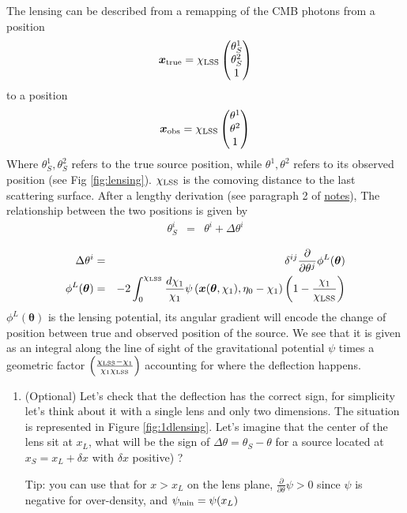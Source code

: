 \documentclass[a4paper, 11pt]{article}
\def\ba{\begin{eqnarray}}
\def\ea{\end{eqnarray}}
\begin{document}
The lensing can be described from a remapping of the CMB photons from a position  
\ba
\bm{x}_{\rm true}  =\chi_{\rm LSS} \begin{pmatrix} 
{\theta}^{1}_{S} \cr
{\theta}^{2}_{S} \cr
 1
 \end{pmatrix} 
\ea
to a position 
\ba
\bm{x}_{\rm obs} = \chi_{\rm LSS}  \begin{pmatrix} 
{\theta}^{1} \cr
{\theta}^{2} \cr
 1
 \end{pmatrix} 
\ea
Where $\theta^{1}_{S}, \theta^{2}_{S}$ refers to the true source position, while  $\theta^{1}, \theta^{2}$ refers to its observed position (see Fig \ref{fig:lensing}).
$\chi_{\rm LSS}$ is the comoving distance to the last scattering surface. After a lengthy derivation (see paragraph 2 of \href{https://github.com/thibautlouis/thibautlouis.github.io/blob/master/derivation.pdf}{notes}), The relationship between the two positions is given by
\ba
 \theta^{i}_{S}  &=&   \theta^{i} + \Delta  \theta^{i} \\
\ea
\ba
 \Delta  \theta^{i} &=& \delta^{ij} \frac{\partial }{\partial \theta^{j}} \phi^{L}(\bm{\theta}) \\
  \phi^{L}(\bm{\theta}) &=&  -2 \int^{\chi_{\rm LSS}}_{0} \frac{d\chi_{1}}{\chi_{1}}  \psi \left( \bm{x}(\bm{\theta}, \chi_{1}), \eta_{0}-\chi_{1} \right)  \left(1 - \frac{\chi_{1}}{\chi_{\rm LSS} } \right)
\ea
$  \phi^{L}(\bm{\theta}) $ is the lensing potential, its angular gradient will encode the change of position between true and observed position of the source.
We see that it is given as an integral along the line of sight of the gravitational potential $\psi$ times a geometric factor $ \left( \frac{\chi_{\rm LSS} -\chi_{1}}{\chi_{1}\chi_{\rm LSS} } \right)$ accounting for where the deflection happens.
\begin{enumerate}
  \renewcommand{\labelenumi}{(\alph{enumi})}
\item (Optional) Let's check that the deflection has the correct sign, for simplicity let's think about it with a single lens and only two dimensions. The situation is represented in Figure \ref{fig:1dlensing}.
Let's imagine that the center of the lens sit at $x_{L}$, what will be the sign of $\Delta  \theta =  \theta_{S}  - \theta$ for a source located at $x_{S}= x_{L} + \delta x$ with $\delta x$ positive) ?

Tip: you can use that for $x>x_{L}$ on the lens plane,   $\frac{\partial }{\partial \theta} \psi  >0$ since $\psi$ is negative for over-density, and $\psi_{\rm min} = \psi(x_{L})$


\end{enumerate}
\end{document}
